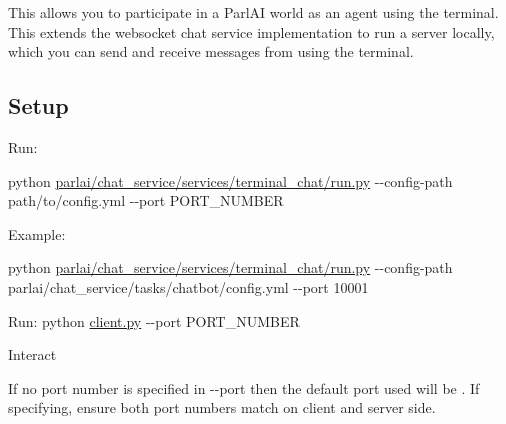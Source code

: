 This allows you to participate in a Parl\+AI world as an agent using the terminal. This extends the {\ttfamily websocket} chat service implementation to run a server locally, which you can send and receive messages from using the terminal.

\subsection*{Setup}


\begin{DoxyEnumerate}
\item Run\+:

{\ttfamily python \hyperlink{parlai_2chat__service_2services_2terminal__chat_2run_8py}{parlai/chat\+\_\+service/services/terminal\+\_\+chat/run.\+py} -\/-\/config-\/path path/to/config.\+yml -\/-\/port P\+O\+R\+T\+\_\+\+N\+U\+M\+B\+ER}

Example\+:

{\ttfamily python \hyperlink{parlai_2chat__service_2services_2terminal__chat_2run_8py}{parlai/chat\+\_\+service/services/terminal\+\_\+chat/run.\+py} -\/-\/config-\/path parlai/chat\+\_\+service/tasks/chatbot/config.\+yml -\/-\/port 10001}
\item Run\+: {\ttfamily python \hyperlink{client_8py}{client.\+py} -\/-\/port P\+O\+R\+T\+\_\+\+N\+U\+M\+B\+ER}
\item Interact
\end{DoxyEnumerate}

If no port number is specified in {\ttfamily -\/-\/port} then the default port used will be {}. If specifying, ensure both port numbers match on client and server side. 